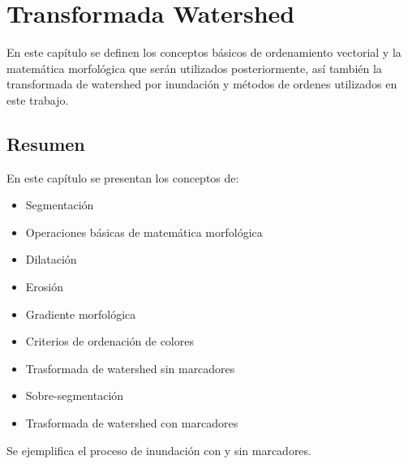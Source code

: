 \chapter{Transformada Watershed}
\label{chap:marco}
En este capítulo se definen los conceptos básicos de  ordenamiento vectorial y la matemática morfológica que serán utilizados posteriormente, así también la transformada de watershed por inundación y métodos de ordenes utilizados en este trabajo. 






\section{Resumen}

En este capítulo se presentan los conceptos de:
\begin{itemize}
\item Segmentación
\item Operaciones básicas de matemática morfológica
\item Dilatación
\item Erosión
\item Gradiente morfológica
\item Criterios de ordenación de colores
\item Trasformada de watershed sin marcadores
\item Sobre-segmentación
\item Trasformada de watershed con marcadores
\end{itemize}
Se ejemplifica el proceso de inundación con y sin marcadores.
